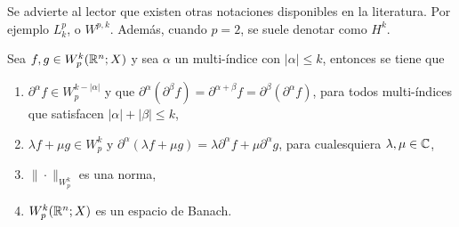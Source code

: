 \begin{remark}
	Se advierte al lector que existen otras notaciones disponibles en la literatura.  Por ejemplo $L^p_k$, o $W^{p,k}$. Además, cuando $p=2$, se suele denotar como $H^k$.
\end{remark}
\begin{theorem} \label{theo:Sobolev-Banach}
	Sea $f, g \in W^k_p(\mathbb{R}^n;X)$ y sea $\alpha$ un multi-índice con $|\alpha|\leq k$, entonces se tiene que 
	\begin{enumerate}
		\item $\partial^\alpha f \in W^{k-|\alpha|}_p$ y que $\partial^{\alpha}(\partial^{\beta}f) = \partial^{\alpha+\beta} f = \partial^{\beta}(\partial^{\alpha}f)$, para todos multi-índices que satisfacen  $|\alpha|+|\beta| \leq k$,
		\item $\lambda f + \mu g \in W^k_p$ y $\partial^\alpha(\lambda f + \mu g) = \lambda\partial^\alpha f + \mu\partial^\alpha g$, para cualesquiera $\lambda, \mu\in \mathbb{C}$,
		\item $\|\cdot\|_{W^k_p}$ es una norma,
		\item $W^k_p(\mathbb{R}^n;X)$ es un espacio de Banach.
	\end{enumerate}  
\end{theorem}
